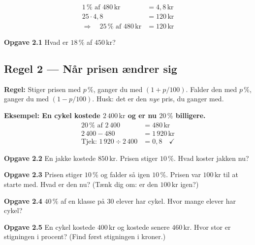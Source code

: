 \documentclass[11pt,a4paper]{article}
\begin{document}
\begin{align*}
  1\,\% \text{ af } 480\,\text{kr} &= 4{,}8\,\text{kr}\\
  25 \cdot 4{,}8 &= 120\,\text{kr}\\[2pt]
  \Rightarrow\quad 25\,\% \text{ af } 480\,\text{kr} &= 120\,\text{kr}
\end{align*}

\begin{opgavebox}
\textbf{Opgave 2.1} \quad Hvad er $18\,\%$ af $450\,\text{kr}$?
\end{opgavebox}

\subsection*{Regel 2 --- Når prisen ændrer sig}

\begin{regelbox}
\textbf{Regel:} Stiger prisen med $p\,\%$, ganger du med $(1 + p/100)$. Falder
den med $p\,\%$, ganger du med $(1 - p/100)$. Husk: det er den \emph{nye}
pris, du ganger med.
\end{regelbox}

\textbf{Eksempel: En cykel kostede $2\,400\,\text{kr}$ og er nu $20\,\%$ billigere.}
\begin{align*}
  20\,\% \text{ af } 2\,400 &= 480\,\text{kr}\\
  2\,400 - 480 &= 1\,920\,\text{kr}\\[2pt]
  \text{Tjek: } 1\,920 \div 2\,400 &= 0{,}8 \quad\checkmark
\end{align*}

\begin{opgavebox}
\textbf{Opgave 2.2} \quad En jakke kostede $850\,\text{kr}$. Prisen stiger
$10\,\%$. Hvad koster jakken nu?
\end{opgavebox}

\begin{opgavebox}
\textbf{Opgave 2.3} \quad Prisen stiger $10\,\%$ og falder så igen $10\,\%$.
Prisen var $100\,\text{kr}$ til at starte med. Hvad er den nu? \hfill
{\small\color{inksoft}(Tænk dig om: er den $100\,\text{kr}$ igen?)}
\end{opgavebox}

\begin{opgavebox}
\textbf{Opgave 2.4} \quad $40\,\%$ af en klasse på $30$ elever har cykel.
Hvor mange elever har cykel?
\end{opgavebox}

\begin{opgavebox}
\textbf{Opgave 2.5} \quad En cykel kostede $400\,\text{kr}$ og kostede
senere $460\,\text{kr}$. Hvor stor er stigningen i procent? \hfill
{\small\color{inksoft}(Find først stigningen i kroner.)}
\end{opgavebox}
\end{document}
